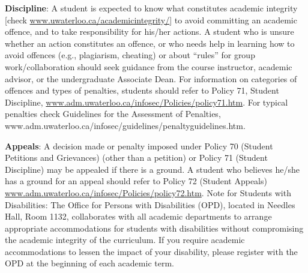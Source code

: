 \documentclass{article}
\begin{document}
\vspace*{1em}\noindent
{\bf Discipline}: A student is expected to know what constitutes academic
integrity [check \url{www.uwaterloo.ca/academicintegrity/}] to avoid
committing an academic offence, and to take responsibility for his/her
actions. A student who is unsure whether an action constitutes an
offence, or who needs help in learning how to avoid offences (e.g.,
plagiarism, cheating) or about “rules” for group work/collaboration
should seek guidance from the course instructor, academic advisor, or
the undergraduate Associate Dean. For information on categories of
offences and types of penalties, students should refer to Policy 71,
Student Discipline,
\url{www.adm.uwaterloo.ca/infosec/Policies/policy71.htm}. For typical
penalties check Guidelines for the Assessment of Penalties,
www.adm.uwaterloo.ca/infosec/guidelines/penaltyguidelines.htm.

\vspace*{1em}\noindent
{\bf Appeals}: A decision made or penalty imposed under Policy 70 (Student
Petitions and Grievances) (other than a petition) or Policy 71
(Student Discipline) may be appealed if there is a ground. A student
who believes he/she has a ground for an appeal should refer to Policy
72 (Student Appeals)
\url{www.adm.uwaterloo.ca/infosec/Policies/policy72.htm}.  Note for Students
with Disabilities: The Office for Persons with Disabilities (OPD),
located in Needles Hall, Room 1132, collaborates with all academic
departments to arrange appropriate accommodations for students with
disabilities without compromising the academic integrity of the
curriculum. If you require academic accommodations to lessen the
impact of your disability, please register with the OPD at the
beginning of each academic term.
\end{document}
